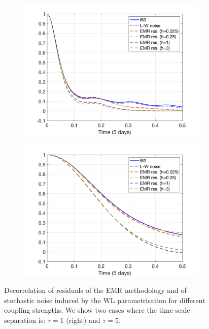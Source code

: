 \documentclass[12pt]{article}
\begin{document}
\begin{figure}[H]
	\centering
	\begin{subfigure}[b]{0.49\textwidth}
		\centering
		\includegraphics[width=\textwidth]{plots/l84l63/acf_res_t5.png}
	\end{subfigure}
	\hfill
	\begin{subfigure}[b]{0.49\textwidth}
		\centering
		\includegraphics[width=\textwidth]{plots/l84l63/acf_res_t1.png}
	\end{subfigure}
	\caption{\label{decorrelation residuals} Decorrelation of residuals of the EMR methodology and of stochastic noise induced by the WL parametrisation for different coupling strengths. We show two cases where the time-scale separation is: $\tau = 1$ (right) and $\tau = 5$.}
\end{figure}
\end{document}
